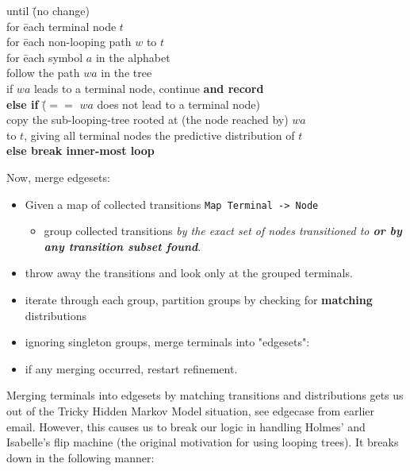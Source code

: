 \documentclass{article}
\begin{document}
\begin{tabbing}
  until \= (no change)\\
  \> for \= each terminal node $t$\\
  \> \> for \= each non-looping path $w$ to $t$\\
  \> \> \> for \= each symbol $a$ in the alphabet\\
  \> \> \> \> follow the path $wa$ in the tree\\
  \> \> \> \> if $wa$ leads to a terminal node, continue {\bf and record}\\
  \> \> \> \> {\bf else if} \= ($==$ $wa$ does not lead to a terminal node)\\
  \> \> \> \> \> copy the sub-looping-tree rooted at (the node reached by) $wa$\\
  \> \> \> \> \> to $t$, giving all terminal nodes the predictive distribution of $t$\\
  \> \> \> \> {\bf else break inner-most loop}
\end{tabbing}

Now, merge edgesets:

\begin{itemize}
  \item Given a map of collected transitions \texttt{Map Terminal -> Node}
  \begin{itemize}
    \item group collected transitions \textit{by the exact set of nodes
    transitioned to \textbf{or by any transition subset found}}.
  \end{itemize}
  \item throw away the transitions and look only at the grouped terminals.
  \item iterate through each group, partition groups by checking for
    \textbf{matching} distributions
  \item ignoring singleton groups, merge terminals into "edgesets":
  \item if any merging occurred, restart refinement.
\end{itemize}

Merging terminals into edgesets by matching transitions and distributions gets
us out of the Tricky Hidden Markov Model situation, see edgecase from earlier
email. However, this causes us to break our logic in handling Holmes' and
Isabelle's flip machine (the original motivation for using looping trees). It
breaks down in the following manner:


\appendix
\end{document}
